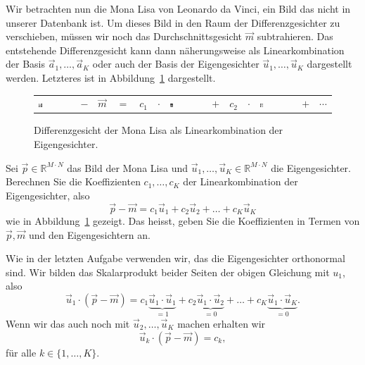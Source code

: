 Wir betrachten nun die Mona Lisa von Leonardo da Vinci, ein Bild das nicht in unserer Datenbank ist.
Um dieses Bild in den Raum der Differenzgesichter zu verschieben, müssen wir noch das Durchschnittsgesicht $\vec m$ subtrahieren.
Das entstehende Differenzgesicht kann dann näherungsweise als Linearkombination der Basis $\vec a_1,\ldots,\vec a_K$ oder auch der Basis der Eigengesichter $\vec u_1,\ldots,\vec u_K$ dargestellt werden.
Letzteres ist in Abbildung~\ref{fig:eigen_basis} dargestellt.
\begin{figure}[ht]
	\centering
	\begin{tabular}{m{1.8cm} c c c c c m{2cm} c c c m{2cm} c c}
		\includegraphics[width=0.1\textwidth]{images/eigenfaces/mona_lisa_original} &
		$-$ & $\vec m$ & $=$ & $c_1$ & $\cdot$ & \includegraphics[width=0.1\textwidth]{images/eigenfaces/eigenface00}
		& $+$ & $c_2$ & $\cdot$ & \includegraphics[width=0.1\textwidth]{images/eigenfaces/eigenface01} & $+$ & $\cdots$
	\end{tabular}
	\caption{Differenzgesicht der Mona Lisa als Linearkombination der Eigengesichter.}
	\label{fig:eigen_basis}
\end{figure}
\begin{aufgabe}
	Sei $\vec p\in\mathbb R^{M\cdot N}$ das Bild der Mona Lisa und $\vec u_1,\ldots,\vec u_K\in\mathbb R^{M\cdot N}$ die Eigengesichter.
	Berechnen Sie die Koeffizienten $c_1,\ldots,c_K$ der Linearkombination der Eigengesichter, also
	\begin{equation*}
		\vec p-\vec m=c_1\vec u_1+c_2\vec u_2+\ldots+c_K\vec u_K
	\end{equation*}
	wie in Abbildung~\ref{fig:eigen_basis} gezeigt.
	Das heisst, geben Sie die Koeffizienten in Termen von $\vec p, \vec m$ und den Eigengesichtern an.
\end{aufgabe}
\begin{losung*}
	Wie in der letzten Aufgabe verwenden wir, das die Eigengesichter orthonormal sind.
	Wir bilden das Skalarprodukt beider Seiten der obigen Gleichung mit $u_1$, also
	\begin{equation*}
		\vec u_1\cdot\left(\vec p-\vec m\right)=c_1\underbrace{\vec u_1\cdot\vec u_1}_{=1}+c_2\underbrace{\vec u_1\cdot\vec u_2}_{=0}+\ldots+c_K\underbrace{\vec u_1\cdot\vec u_K}_{=0}.
	\end{equation*}
	Wenn wir das auch noch mit $\vec u_2,\ldots,\vec u_K$ machen erhalten wir
	\begin{equation*}
		\vec u_k\cdot\left(\vec p-\vec m\right)=c_k,
	\end{equation*}
	für alle $k\in\{1,\ldots,K\}$.
\end{losung*}
